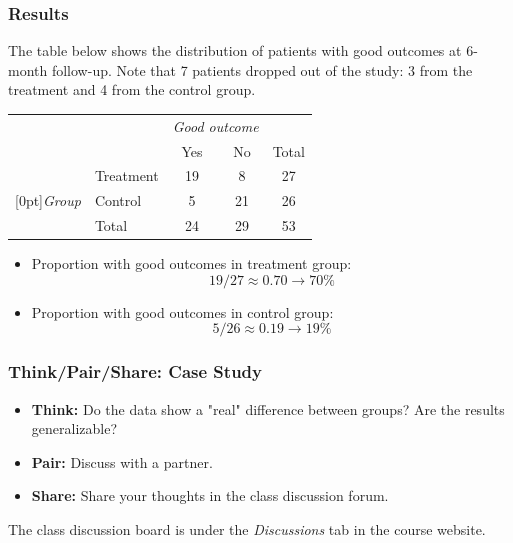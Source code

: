 \documentclass[slidestop,compress,mathserif]{beamer}
\begin{document}

\begin{frame}
\frametitle{Results}

The table below shows the distribution of patients with good outcomes at 6-month follow-up. Note that 7 patients dropped out of the study: 3 from the treatment and 4 from the control group.

\begin{center}
\begin{tabular}{ll  cc c} 
			&				& \multicolumn{2}{c}{\textit{Good outcome}} \\
\cline{3-4}
			&							& Yes 	& No 	& Total	\\
\cline{2-5}
							&Treatment 	& 19	 	& 8		& 27 	\\
\raisebox{1.5ex}[0pt]{\textit{Group}}	&Control		& 5	 	& 21	 	& 26 \\
\cline{2-5}
							&Total		& 24		& 29		& 53
\end{tabular}
\end{center}

\pause

\begin{itemize}

\item Proportion with good outcomes in treatment group:
\[ 19 / 27 \approx 0.70 \rightarrow 70\% \]

\pause

\item Proportion with good outcomes in control group:
\[ 5 / 26 \approx 0.19 \rightarrow 19\% \]

\end{itemize}

\end{frame}

\begin{frame}
	\frametitle{Think/Pair/Share: Case Study}
	\begin{itemize}
		\item \textbf{Think:} Do the data show a "real" difference between groups? Are the results generalizable?
		\item \textbf{Pair:} Discuss with a partner.
		\item \textbf{Share:} Share your thoughts in the class discussion forum.
	\end{itemize}

	The class discussion board is under the \textit{Discussions} tab in the course website. %
\end{frame}
\end{document}
